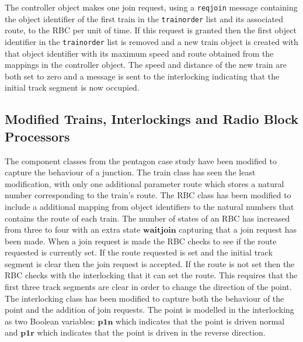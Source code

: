 The controller object makes one join request, using a \texttt{reqjoin} message containing the object identifier of the first train in the \texttt{trainorder} list and its associated route, to the RBC per unit of time. If this request is granted then the first object identifier in the \texttt{trainorder} list is removed and a new train object is created with that object identifier with its maximum speed and route obtained from the mappings in the controller object. The speed and distance of the new train are both set to zero and a message is sent to the interlocking indicating that the initial track segment is now occupied. 

\subsection*{Modified Trains, Interlockings and Radio Block Processors}
The component classes from the pentagon case study have been modified to capture the behaviour of a junction.  The train class has seen the least modification, with only one additional parameter route which stores a natural number corresponding to the train's route. The RBC class has been modified to include a additional mapping from object identifiers to the natural numbers that contains the route of each train. The number of states of an RBC has increased from three to four with an extra state $\mathbf{waitjoin}$ capturing that a join request has been made. When a join request is made the RBC checks to see if the route requested is currently set. If the route requested is set and the initial track segment is clear then the join request is accepted. If the route is not set then the RBC checks with the interlocking that it can set the route. This requires that the first three track segments are clear in order to change the direction of the point. The interlocking class has been modified to capture both the behaviour of the point and the addition of join requests. The point is modelled in the interlocking as two Boolean variables: $\mathbf{p1n}$ which indicates that the point is driven normal and $\mathbf{p1r}$ which indicates that the point is driven in the reverse direction.
%

